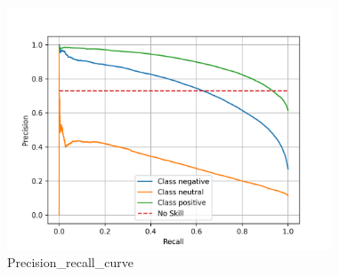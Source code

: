 \documentclass{article}%
\begin{document}
{%
\newpage%
\raggedright%


\begin{figure}[h!]%
\centering%
\includegraphics[width=365px]{./report/Learning/Svm_Svc/Recall-Precision.png}%
\caption{Precision\_recall\_curve}%
\end{figure}

%
}%
\pagestyle{firstpage}%
\newpage%
\end{document}
